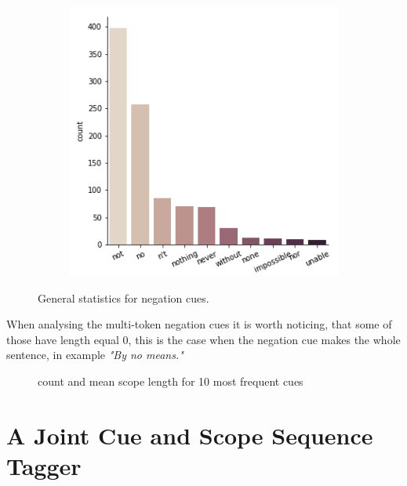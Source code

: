 \documentclass{article}
\begin{document}
\begin{figure}[h]
    \begin{subfigure}{0.5\textwidth}
        \centering
        
    \end{subfigure}
    \begin{subfigure}{0.5\textwidth}
        \centering
        \includegraphics[scale=0.5]{../figures/negation_count.png}
    \end{subfigure}
    \caption{General statistics for negation cues.}
\end{figure}

When analysing the multi-token negation cues it is worth noticing,
that some of those have length equal 0, this is the case when the negation cue makes the whole sentence,
in example \textit{"By no means."}

\begin{figure}[h]
    \begin{subfigure}{0.45\textwidth}
        \centering
        
    \end{subfigure}
    \hfill
    \begin{subfigure}{0.45\textwidth}
        \centering
        
    \end{subfigure}
    \caption{count and mean scope length for 10 most frequent cues}
\end{figure}

\section{A Joint Cue and Scope Sequence Tagger}
\end{document}
